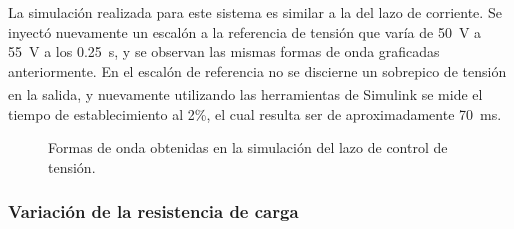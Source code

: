 La simulación realizada para este sistema es similar a la del lazo de corriente. Se inyectó nuevamente un escalón a la referencia de tensión que varía de \SI{50}{\volt} a \SI{55}{\volt} a los \SI{0.25}{\second}, y se observan las mismas formas de onda graficadas anteriormente. En el escalón de referencia no se discierne un sobrepico de tensión en la salida, y nuevamente utilizando las herramientas de Simulink\textsuperscript\textregistered \hspace{0.6pt} se mide el tiempo de establecimiento al 2\%, el cual resulta ser de aproximadamente \SI{70}{\milli\second}.

\begin{figure}[hbt!]
  \centering
  \hspace{3.5mm}
  \hspace{3.5mm}
  \hspace{3.5mm}
  \caption{Formas de onda obtenidas en la simulación del lazo de control de tensión.}
  \label{formas-onda-lazo-tension}
\end{figure}

\subsubsection{Variación de la resistencia de carga}

